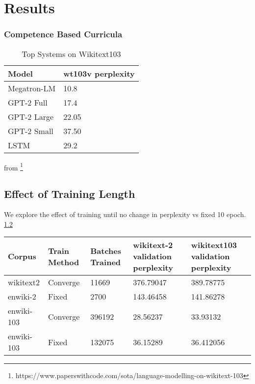 \chapter{Results}
\subsection{Competence Based Curricula}
\begin{table}[h!]
\begin{tabular}{|l|l|} \hline
\textbf{Model} & \textbf{wt103v perplexity} \\ \hline
Megatron-LM & 10.8 \\ \hline
GPT-2 Full & 17.4 \\ \hline
GPT-2 Large & 22.05 \\ \hline
GPT-2 Small & 37.50 \\ \hline
LSTM & 29.2 \\ \hline
\end{tabular}
\caption{Top Systems on Wikitext103}
\label{table:top103}
\end{table}
from \footnote{https://www.paperswithcode.com/sota/language-modelling-on-wikitext-103}
\section{Effect of Training Length}
We explore the effect of training until no change in perplexity vs fixed 10 epoch.  \ref{table:effectoftrainlen}
\begin{table}[h]
\tiny
\begin{tabular}{|l|l|l|l|l|} \hline
\textbf{Corpus} & \textbf{Train Method} & \textbf{Batches Trained} & \textbf{wikitext-2 validation perplexity} & \textbf{wikitext103 validation perplexity} \\ \hline
wikitext2 & Converge & 11669 & 376.79047  & 389.78775 \\ \hline
enwiki-2 & Fixed & 2700  & 143.46458 & 141.86278 \\ \hline
enwiki-103 & Converge & 396192 & 28.56237 &  33.93132 \\ \hline
enwiki-103 & Fixed & 132075 & 36.15289 & 36.412056  \\ \hline
\end{tabular}
\label{table:effectoftrainlen}
\end{table}
